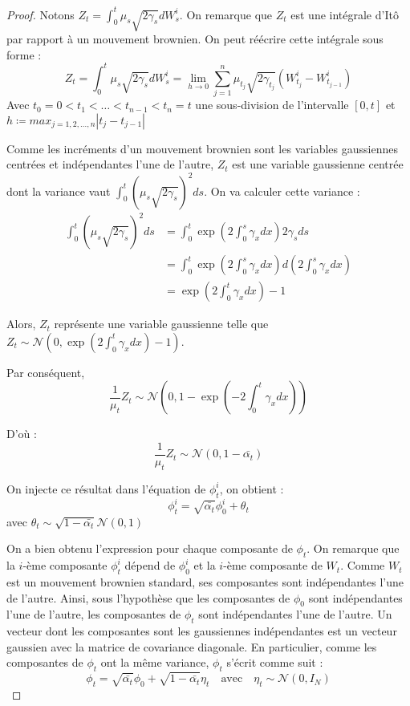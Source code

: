 \documentclass[a4paper,10pt]{article}
\theoremstyle{definition} %
\theoremstyle{definition} %
\theoremstyle{definition} %
\theoremstyle{definition} %
\begin{document}
\begin{proof}
    Notons $Z_t = \int_0^t\mu_s\sqrt{2\gamma_s}dW_s^i$. On remarque que $Z_t$ est une intégrale d'Itô par rapport à un mouvement brownien. On peut réécrire cette intégrale sous forme :
    \[Z_t=\int_0^t\mu_s\sqrt{2\gamma_s}dW_s^i = \lim_{h\rightarrow 0} \sum_{j=1}^{n} \mu_{t_j}\sqrt{2\gamma_{t_j}}(W^i_{t_j}-W^i_{t_{j-1}})\]
    Avec $t_0=0 < t_1<\dots<t_{n-1} < t_{n} = t$ une sous-division de l'intervalle $[0,t]$ et $h \coloneqq max_{j = 1,2,\dots,n} |t_j - t_{j-1}|$

    Comme les incréments d'un mouvement brownien sont les variables gaussiennes centrées et indépendantes l'une de l'autre, $Z_t$ est une variable gaussienne centrée dont la variance vaut $\int_0^t(\mu_s\sqrt{2\gamma_s})^2 ds $. On va calculer cette variance :
    \begin{align*}
        \int_0^t(\mu_s\sqrt{2\gamma_s})^2ds &= \int_0^t \exp(2 \int_0^s \gamma_xdx) 2 \gamma_s ds \\ 
        &=\int_0^t \exp(2 \int_0^s \gamma_xdx) d(2 \int_0^s \gamma_xdx)\\
        &= \exp(2 \int_0^t \gamma_xdx) -1
    \end{align*}
    
    Alors, $Z_t$ représente une variable gaussienne telle que  $Z_t \sim \mathcal{N}\left(0, \exp(2 \int_0^t \gamma_xdx) -1\right) $.
    
    Par conséquent, 
    \[\frac{1}{\mu_t}Z_t \sim \mathcal{N}\left(0, 1-\exp(-2 \int_0^t \gamma_xdx)\right)\]
    
    D'où :
    \[\frac{1}{\mu_t}Z_t \sim \mathcal{N}\left(0, 1-\bar{\alpha_t}\right)\]

    On injecte ce résultat dans l'équation de $\phi_t^i$, on obtient :
    \[\phi_t^i = \sqrt{\bar{\alpha_t}}\phi_0^i + \theta_t\]
    avec $\theta_t \sim \sqrt{1-\bar{\alpha_t}}\mathcal{N}\left(0, 1\right)$

    On a bien obtenu l'expression pour chaque composante de $\phi_t$. On remarque que la $i$-ème composante $\phi_t^i$ dépend de $\phi_0^i$ et la $i$-ème composante de $W_t$. Comme $W_t$ est un mouvement brownien standard, ses composantes sont indépendantes l'une de l'autre. Ainsi, sous l'hypothèse que les composantes de $\phi_0$ sont indépendantes l'une de l'autre, les composantes de $\phi_t$ sont indépendantes l'une de l'autre. Un vecteur dont les composantes sont les gaussiennes indépendantes est un vecteur gaussien avec la matrice de covariance diagonale. En particulier, comme les composantes de $\phi_t$ ont la même variance, $\phi_t$ s'écrit comme suit :
    \[\phi_t = \sqrt{\bar{\alpha_t}}\phi_0 + \sqrt{1-\bar{\alpha_t}}\eta_t \quad \text{avec} \quad \eta_t \sim \mathcal{N}(0, I_N)\] 
\end{proof}





 
\end{document}
